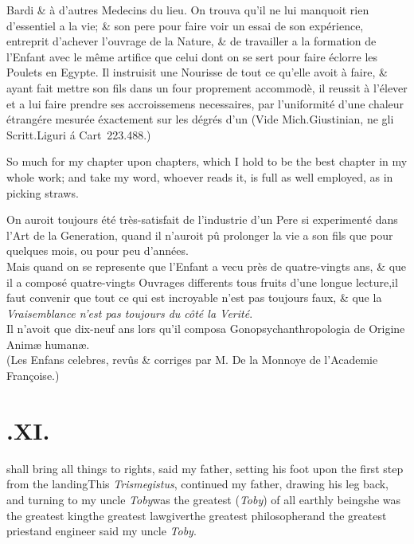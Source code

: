 \documentclass[twoside]{article}
\begin{document}
\vfill
\bgroup\footnotesize
\noindent
Bardi \& à d’autres Medecins du lieu.  On trouva
qu’il ne lui manquoit rien d’essentiel a la vie; \&
son pere pour faire voir un essai de son expérience, 
entreprit d’achever l’ouvrage de la Nature, \& de 
travailler a la formation de l’Enfant avec le même 
artifice que celui dont on se sert pour faire éclorre
les Poulets en Egypte. Il instruisit une Nourisse 
de tout ce qu’elle avoit à faire, \& ayant fait mettre
son fils dans un four proprement accommodè, il
reussit à l’élever et a lui faire prendre ses accroissemens 
necessaires, par l’uniformité d’une chaleur 
étrangére mesurée éxactement sur les dégrés d’un 
(Vide Mich.\@  Giustinian, ne gli Scritt.\@ Liguri á\break
Cart~223.\@ 488.)\hfill\break{}\par\egroup
\newpage
So much for my chapter upon chapters, which I hold
to be the best chapter in my whole work; and take my word, whoever
reads it, is full as well employed, as in picking straws.

\vfill


\vfill

\bgroup\footnotesize
On auroit toujours été très-satisfait de l’industrie
d’un Pere si experimenté dans l’Art de la Generation,
quand il n’auroit pû prolonger la vie a son
fils que pour quelques mois, ou pour peu d’années.\\
\indent
Mais quand on se represente que l’Enfant a vecu
près de quatre-vingts ans, \& que il a composé 
quatre-vingts Ouvrages differents tous fruits d’une 
longue lecture,\tsk il faut convenir que tout ce qui
est incroyable n’est pas toujours faux, \& que la 
\textit{Vraisemblance n’est pas toujours du côté la Verité}.\\
\indent
Il n’avoit que dix-neuf ans lors qu’il composa
Gonopsychanthropologia de Origine Animæ humanæ.\\
\indent
(Les Enfans celebres, revûs \& corriges par M. De la Monnoye de
l’Academie Françoise.)\par\egroup

\newpage
\null\smallskip
\section{.\enspace XI.}

 shall bring all things to rights, said my father, setting his foot upon
the first step from the landing\tsh This \textit{Trismegistus}, continued my father,
drawing his leg back, and turning to my uncle \textit{Toby}\tsk was the greatest
(\textit{Toby}) of all earthly beings\tsk he was the greatest king\tsk the greatest
lawgiver\tsk the greatest philosopher\tsk and the greatest
priest\tsh and engineer\tsk
said my uncle \textit{Toby}.\tsk
\end{document}
